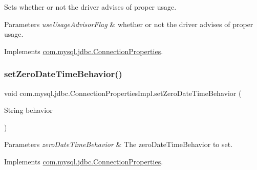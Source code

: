 Sets whether or not the driver advises of proper usage.


\begin{DoxyParams}{Parameters}
{\em use\+Usage\+Advisor\+Flag} & whether or not the driver advises of proper usage. \\
\hline
\end{DoxyParams}


Implements \mbox{\hyperlink{interfacecom_1_1mysql_1_1jdbc_1_1_connection_properties_a8c6cb2052bdd1e63d3be6d2fcbd3908c}{com.\+mysql.\+jdbc.\+Connection\+Properties}}.

\mbox{\label{classcom_1_1mysql_1_1jdbc_1_1_connection_properties_impl_a33ad0a39d9fcf2e41a074d50cfe7c226}} 
\subsubsection{\texorpdfstring{set\+Zero\+Date\+Time\+Behavior()}{setZeroDateTimeBehavior()}}
{\footnotesize\ttfamily void com.\+mysql.\+jdbc.\+Connection\+Properties\+Impl.\+set\+Zero\+Date\+Time\+Behavior (\begin{DoxyParamCaption}\item[{String}]{behavior }\end{DoxyParamCaption})}


\begin{DoxyParams}{Parameters}
{\em zero\+Date\+Time\+Behavior} & The zero\+Date\+Time\+Behavior to set. \\
\hline
\end{DoxyParams}


Implements \mbox{\hyperlink{interfacecom_1_1mysql_1_1jdbc_1_1_connection_properties_a985e00fab1822f34c53443de78f7f597}{com.\+mysql.\+jdbc.\+Connection\+Properties}}.

